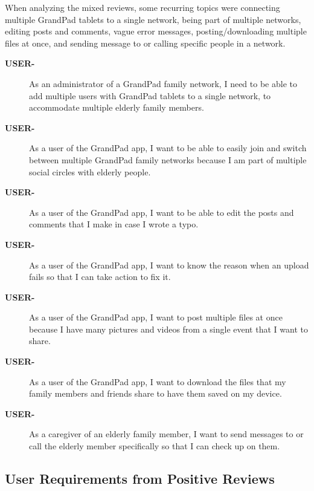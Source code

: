 When analyzing the mixed reviews, some recurring topics were
    connecting multiple GrandPad tablets to a single network,
    being part of multiple networks,
    editing posts and comments,
    vague error messages,
    posting/downloading multiple files at once,
    and sending message to or calling specific people in a network.

\begin{description}
    \item[\textbf{USER-\showmycounter}]
        As an administrator of a GrandPad family network, I need to be able to
            add multiple users with GrandPad tablets to a single network, to
            accommodate multiple elderly family members.
    \item[\textbf{USER-\showmycounter}]
        As a user of the GrandPad app, I want to be able to easily join and
            switch between multiple GrandPad family networks because I am part
            of multiple social circles with elderly people.
    \item[\textbf{USER-\showmycounter}]
        As a user of the GrandPad app, I want to be able to edit the posts and
            comments that I make in case I wrote a typo.
    \item[\textbf{USER-\showmycounter}]
        As a user of the GrandPad app, I want to know the reason when an upload
            fails so that I can take action to fix it.
    \item[\textbf{USER-\showmycounter}]
        As a user of the GrandPad app, I want to post multiple files at once
            because I have many pictures and videos from a single event that I
            want to share.
    \item[\textbf{USER-\showmycounter}]
        As a user of the GrandPad app, I want to download the files that my
            family members and friends share to have them saved on my device.
    \item[\textbf{USER-\showmycounter}]
        As a caregiver of an elderly family member, I want to send messages to
            or call the elderly member specifically so that I can check up on
            them.
\end{description}

\subsection*{User Requirements from Positive Reviews}

